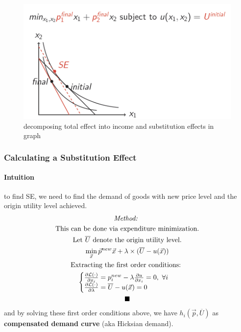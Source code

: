 \documentclass{article}
\newcommand{\mc}[1]{\mathcal{#1}}
\begin{document}
			\begin{figure}[h]
				\centering
				\includegraphics[width=0.8\linewidth]{figure/lec5_1}
				\caption{decomposing total effect into income and substitution effects in graph}
			\end{figure}
			
			\subsubsection{Calculating a Substitution Effect}
				\paragraph{Intuition} to find SE, we need to find the demand of goods with new price level and the origin utility level achieved.
				\begin{multline*}
					\emph{Method: }\\
					\tx{This can be done via expenditure minimization.} \\
					\tx{Let $\overline{U}$ denote the origin utility level.} \\
					\min_{\vec{x}} \vec{p}^{new} \vec{x} + \lambda \times (\overline{U} - u(\vec{x})) \\
					\tx{Extracting the first order conditions: }\\
					\begin{cases}
						\pd{\mc{L}(\cdot)}{x_i} = p_i^{new} - \lambda \pd{u}{x_i} = 0,\ \forall i\\
						\pd{\mc{L}(\cdot)}{\lambda} = \overline{U} - u(\vec{x}) = 0 \\
					\end{cases} \\
					\blacksquare
				\end{multline*}
				and by solving these first order conditions above, we have $h_i(\vec{p}, \overline{U})$ as \textbf{compensated demand curve} (aka Hicksian demand).
		
\end{document}
